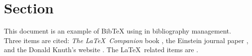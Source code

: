 \documentclass{article}
\begin{document}
\section{Section}
This document is an example of BibTeX using in bibliography management. 
Three items are cited: \textit{The \LaTeX\ Companion} book \cite{latexcompanion}, the Einstein journal paper \cite{einstein}, and the Donald Knuth's website \cite{knuthwebsite}. 
The \LaTeX\ related items are \cite{latexcompanion,knuthwebsite}. 

\medskip


\end{document}
